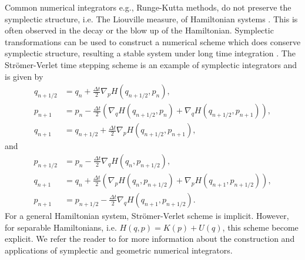 Common numerical integrators e.g., Runge-Kutta methods, do not preserve the symplectic structure, i.e. The Liouville measure, of Hamiltonian systems \cite{Hairer:1250576,Marsden:1999ck}. This is often observed in the decay or the blow up of the Hamiltonian. Symplectic transformations can be used to construct a numerical scheme which does conserve symplectic structure, resulting a stable system under long time integration \cite{Hairer:1250576}. The Str\"omer-Verlet time stepping scheme is an example of symplectic integrators and is given by
\begin{equation} \label{eq:Hasy:13}
\begin{aligned}
	q_{n+1/2} &= q_n + \frac{\Delta t}{2} \nabla_pH(q_{n+1/2},p_n), \\
	p_{n+1} &= p_n - \frac{\Delta t}{2} \left( \nabla_qH(q_{n+1/2},p_n) + \nabla_qH(q_{n+1/2},p_{n+1}) \right),\\
	q_{n+1} &= q_{n+1/2} + \frac{\Delta t}{2} \nabla_pH(q_{n+1/2},p_{n+1}),
\end{aligned}
\end{equation}
and
\begin{equation} \label{eq:Hasy:14}
\begin{aligned}
	p_{n+1/2} &= p_n - \frac{\Delta t}{2} \nabla_qH(q_{n},p_{n+1/2}), \\
	q_{n+1} &= q_n + \frac{\Delta t}{2} \left( \nabla_pH(q_{n},p_{n+1/2}) + \nabla_pH(q_{n+1},p_{n+1/2}) \right),\\
	p_{n+1} &= p_{n+1/2} - \frac{\Delta t}{2} \nabla_qH(q_{n+1},p_{n+1/2}).
\end{aligned}
\end{equation}
For a general Hamiltonian system, Str\"omer-Verlet scheme is implicit. However, for separable Hamiltonians, i.e. $H(q,p) = K(p) + U(q)$, this scheme become explicit. We refer the reader to \cite{Hairer:1250576} for more information about the construction and applications of symplectic and geometric numerical integrators. 
